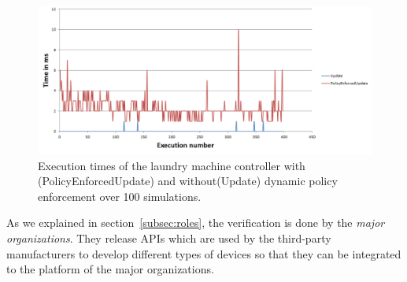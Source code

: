 \documentclass{article}
\begin{document}
\begin{figure}[htpb]
\begin{center}
\includegraphics[scale=0.35, trim = 0 0 0 0]{results_update.png}
\caption{Execution times of the laundry machine controller with (PolicyEnforcedUpdate) and without(Update) dynamic policy enforcement over 100 simulations.}
\label{fig:dynamic}
\end{center}
\end{figure}
As we explained in section~\ref{subsec:roles}, the verification is done by the \textit{major organizations}. They release APIs which are used by the third-party manufacturers to develop different types of devices so that they can be integrated to the platform of the major organizations.  
\end{document}
